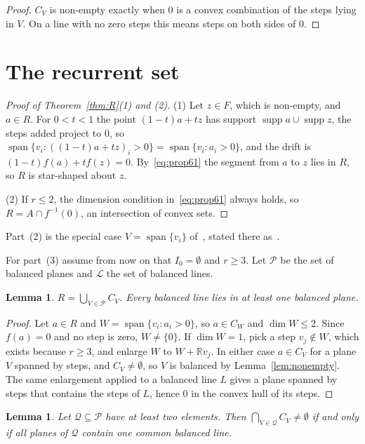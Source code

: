 \documentclass[11pt]{amsart}
\newtheorem{lemma}[theorem]{Lemma}
\theoremstyle{remark}
\newcommand{\R}{\mathbb{R}}
\newcommand{\spn}{\operatorname{span}}
\newcommand{\supp}{\operatorname{supp}}
\begin{document}
\begin{proof}
$C_V$ is non-empty exactly when $0$ is a convex combination of the steps lying in $V$. On a line with no zero steps
this means steps on both sides of $0$.
\end{proof}

\section{The recurrent set}\label{sec:R}

\begin{proof}[Proof of Theorem~\ref{thm:R}(1) and (2)]
(1) Let $z\in F$, which is non-empty, and $a\in R$. For $0<t<1$ the point $(1-t)a+tz$ has support
$\supp a\cup\supp z$, the steps added project to $0$, so $\spn\{v_i: ((1-t)a+tz)_i>0\}=\spn\{v_i:a_i>0\}$, and the
drift is $(1-t)f(a)+tf(z)=0$. By~\eqref{eq:prop61} the segment from $a$ to $z$ lies in $R$, so $R$ is star-shaped
about $z$.

(2) If $r\le2$, the dimension condition in~\eqref{eq:prop61} always holds, so $R=A\cap f^{-1}(0)$, an intersection of
convex sets.
\end{proof}

Part~(2) is the special case $V=\spn\{v_i\}$ of~\cite[Theorem~6.5]{LMW}, stated there as~\cite[Corollary~6.6]{LMW}.

For part~(3) assume from now on that $I_0=\emptyset$ and $r\ge3$. Let $\mathcal P$ be the set of balanced planes and
$\mathcal L$ the set of balanced lines.

\begin{lemma}\label{lem:cover}
$R=\bigcup_{V\in\mathcal P}C_V$. Every balanced line lies in at least one balanced plane.
\end{lemma}

\begin{proof}
Let $a\in R$ and $W=\spn\{v_i:a_i>0\}$, so $a\in C_W$ and $\dim W\le2$. Since $f(a)=0$ and no step is zero, $W\ne\{0\}$.
If $\dim W=1$, pick a step $v_j\notin W$, which exists because $r\ge3$, and enlarge $W$ to $W+\R v_j$. In either case
$a\in C_V$ for a plane $V$ spanned by steps, and $C_V\ne\emptyset$, so $V$ is balanced by Lemma~\ref{lem:nonempty}. The
same enlargement applied to a balanced line $L$ gives a plane spanned by steps that contains the steps of $L$, hence
$0$ in the convex hull of its steps.
\end{proof}

\begin{lemma}\label{lem:nerve}
Let $\mathcal Q\subseteq\mathcal P$ have at least two elements. Then $\bigcap_{V\in\mathcal Q}C_V\ne\emptyset$ if and
only if all planes of $\mathcal Q$ contain one common balanced line.
\end{lemma}
\end{document}
